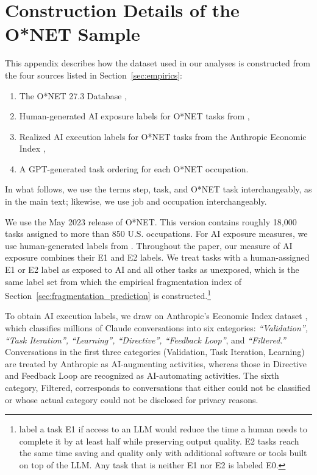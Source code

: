 \section{Construction Details of the O*NET Sample}
\label{app:data_prep}

This appendix describes how the dataset used in our analyses is constructed from the four sources listed in Section~\ref{sec:empirics}:
\begin{enumerate}
    \item The O*NET 27.3 Database \citep{onet27_3},
    \item Human-generated AI exposure labels for O*NET tasks from \cite{eloundou2023gpts},
    \item Realized AI execution labels for O*NET tasks from the Anthropic Economic Index \citep{handa2025economictasksperformedai},
    \item A GPT-generated task ordering for each O*NET occupation.
\end{enumerate}
In what follows, we use the terms step, task, and O*NET task interchangeably, as in the main text; likewise, we use job and occupation interchangeably.

We use the May 2023 release of O*NET. 
This version contains roughly 18{,}000 tasks assigned to more than 850 U.S. occupations.
For AI exposure measures, we use human-generated labels from \cite{eloundou2023gpts}.
Throughout the paper, our measure of AI exposure combines their E1 and E2 labels.
We treat tasks with a human-assigned E1 or E2 label as exposed to AI and all other tasks as unexposed, which is the same label set from which the empirical fragmentation index of Section~\ref{sec:fragmentation_prediction} is constructed.\footnote{
\cite{eloundou2023gpts} label a task E1 if access to an LLM would reduce the time a human needs to complete it by at least half while preserving output quality.
E2 tasks reach the same time saving and quality only with additional software or tools built on top of the LLM.
Any task that is neither E1 nor E2 is labeled E0.
}

To obtain AI execution labels, we draw on Anthropic's Economic Index dataset \citep{handa2025economictasksperformedai}, which classifies millions of Claude conversations into six categories: \textit{``Validation'', ``Task Iteration'', ``Learning'', ``Directive'', ``Feedback Loop''}, and \textit{``Filtered.''}
Conversations in the first three categories (Validation, Task Iteration, Learning) are treated by Anthropic as AI-augmenting activities, whereas those in Directive and Feedback Loop are recognized as AI-automating activities.
The sixth category, Filtered, corresponds to conversations that either could not be classified or whose actual category could not be disclosed for privacy reasons.

